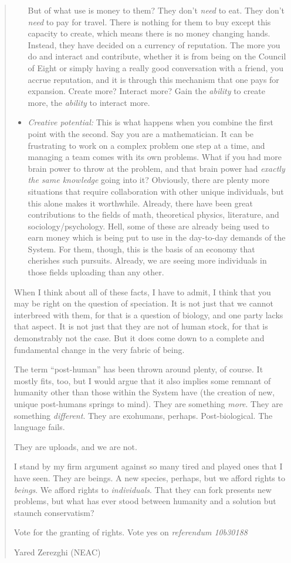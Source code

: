 \begin{quote}
\begin{itemize}
  But of what use is money to them? They don't \emph{need} to eat. They don't \emph{need} to pay for travel. There is nothing for them to buy except this capacity to create, which means there is no money changing hands. Instead, they have decided on a currency of reputation. The more you do and interact and contribute, whether it is from being on the Council of Eight or simply having a really good conversation with a friend, you accrue reputation, and it is through this mechanism that one pays for expansion. Create more? Interact more? Gain the \emph{ability} to create more, the \emph{ability} to interact more.
\item
  \emph{Creative potential:} This is what happens when you combine the first point with the second. Say you are a mathematician. It can be frustrating to work on a complex problem one step at a time, and managing a team comes with its own problems. What if you had more brain power to throw at the problem, and that brain power had \emph{exactly the same knowledge} going into it? Obviously, there are plenty more situations that require collaboration with other unique individuals, but this alone makes it worthwhile. Already, there have been great contributions to the fields of math, theoretical physics, literature, and sociology/psychology. Hell, some of these are already being used to earn money which is being put to use in the day-to-day demands of the System. For them, though, this is the basis of an economy that cherishes such pursuits. Already, we are seeing more individuals in those fields uploading than any other.
\end{itemize}

When I think about all of these facts, I have to admit, I think that you may be right on the question of speciation. It is not just that we cannot interbreed with them, for that is a question of biology, and one party lacks that aspect. It is not just that they are not of human stock, for that is demonstrably not the case. But it does come down to a complete and fundamental change in the very fabric of being.

The term ``post-human'' has been thrown around plenty, of course. It mostly fits, too, but I would argue that it also implies some remnant of humanity other than those within the System have (the creation of new, unique post-humans springs to mind). They are something \emph{more}. They are something \emph{different}. They are exohumans, perhaps. Post-biological. The language fails.

They are uploads, and we are not.

I stand by my firm argument against so many tired and played ones that I have seen. They are beings. A new species, perhaps, but we afford rights to \emph{beings}. We afford rights to \emph{individuals}. That they can fork presents new problems, but what has ever stood between humanity and a solution but staunch conservatism?

Vote for the granting of rights. Vote yes on \emph{referendum 10b30188}

Yared Zerezghi (NEAC)
\end{quote}

